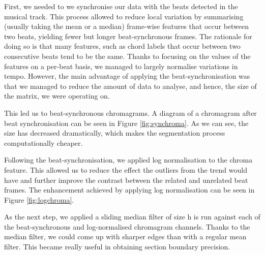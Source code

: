 First, we needed to we synchronise our data with the beats detected in the musical track. This process allowed to reduce local variation by summarising (usually taking the mean or a median) frame-wise features that occur between two beats, yielding fewer but longer beat-synchronous frames. The rationale for doing so is that many features, such as chord labels that occur between two consecutive beats tend to be the same. Thanks to focusing on the values of the features on a per-beat basis, we managed to largely normalise variations in tempo. However, the main advantage of applying the beat-synchronisation was that we managed to reduce the amount of data to analyse, and hence, the size of the matrix, we were operating on.

This led us to beat-synchronous chromagrams. A diagram of a chromagram after beat synchronisation can be seen in Figure \ref{fig:synchroma}. As we can see, the size has decreased dramatically, which makes the segmentation process computationally cheaper.

Following the beat-synchronisation, we applied log normalisation to the chroma feature. This allowed us to reduce the effect the outliers from the trend would have and further improve the contrast between the related and unrelated beat frames. The enhancement achieved by applying log normalisation can be seen in Figure \ref{fig:logchroma}.

As the next step, we applied a sliding median filter of size h is run against each of the beat-synchronous and log-normalised chromagram channels. Thanks to the median filter, we could come up with sharper edges than with a regular mean filter. This became really useful in obtaining section boundary precision.

